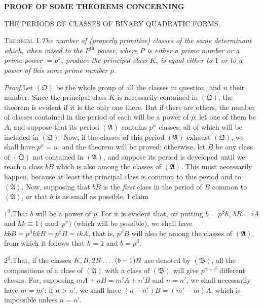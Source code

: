 \clearpage
{}
\renewcommand{\BookRunningTitle}{The Periods of Classes}
\begin{center}
\Large\bfseries PROOF OF SOME THEOREMS CONCERNING\par\medskip
\large THE PERIODS OF CLASSES OF BINARY QUADRATIC FORMS.
\end{center}

\textsc{Theorem. I.}\quad\emph{The number of (properly primitive) classes of the same determinant which, when raised to the $P^{\mathrm{th}}$ power, where $P$ is either a prime number or a prime power $=p^\pi$, produce the principal class $K$, is equal either to $1$ or to a power of this same prime number $p$.}

\emph{Proof.}\quad Let $(\mathfrak Q)$ be the whole group of all the classes in question, and $n$ their number. Since the principal class $K$ is necessarily contained in $(\mathfrak Q)$, the theorem is evident if it is the only one there. But if there are others, the number of classes contained in the period of each will be a power of $p$; let one of them be $A$, and suppose that its period $(\mathfrak A)$ contains $p^\alpha$ classes, all of which will be included in $(\mathfrak Q)$. Now, if the classes of this period $(\mathfrak A)$ exhaust $(\mathfrak Q)$, we shall have $p^\alpha=n$, and the theorem will be proved; otherwise, let $B$ be any class of $(\mathfrak Q)$ not contained in $(\mathfrak A)$, and suppose its period is developed until we reach a class $bB$ which is also among the classes of $(\mathfrak A)$. This must necessarily happen, because at least the principal class is common to this period and to $(\mathfrak A)$. Now, supposing that $bB$ is the \emph{first} class in the period of $B$ common to $(\mathfrak A)$, or that $b$ is as small as possible, I claim

$1^0$.\quad That $b$ will be a power of $p$. For it is evident that, on putting $b=p^\beta h$, $bB=iA$ and $hk\equiv1\pmod{p^\pi}$ (which will be possible), we shall have $kbB=p^\beta hkB=p^\beta B=ikA$,
that is, $p^\beta B$ will also be among the classes of $(\mathfrak A)$, from which it follows that $h=1$ and $b=p^\beta$.

$2^0$.\quad That, if the classes $K,B,2B\mathinner{.\,.\,.\,.}(b-1)B$ are denoted by $(\mathfrak B)$, all the compositions of a class of $(\mathfrak A)$ with a class of $(\mathfrak B)$ will give $p^{\alpha+\beta}$ different classes. For, supposing $mA+nB=m'A+n'B$ and $n=n'$, we shall necessarily have $m=m'$; if $n>n'$, we shall have $(n-n')B=(m'-m)A$, which is impossible unless $n=n'$.

